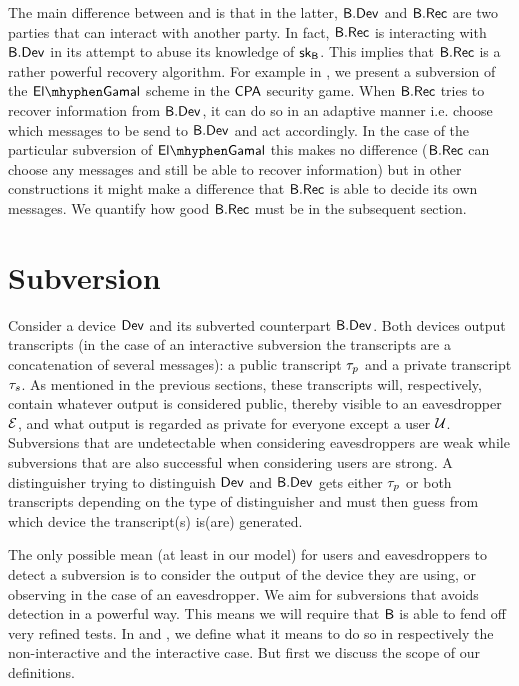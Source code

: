 The main difference between  and  is that in the latter, $\mathsf{B}.\mathsf{Dev}$ and $\mathsf{B}.\mathsf{Rec}$ are two parties that can interact with another party. In fact, $\mathsf{B}.\mathsf{Rec}$ is interacting with $\mathsf{B}.\mathsf{Dev}$ in its attempt to abuse its knowledge of $\mathsf{sk}_{\mathsf{B}}$. This implies that $\mathsf{B}.\mathsf{Rec}$ is a rather powerful recovery algorithm. For example in , we present a subversion of the $\elGamal$ scheme in the $\mathsf{CPA}$ security game. When $\mathsf{B}.\mathsf{Rec}$ tries to recover information from $\mathsf{B}.\mathsf{Dev}$, it can do so in an adaptive manner i.e. choose which messages to be send to $\mathsf{B}.\mathsf{Dev}$ and act accordingly. In the case of the particular subversion of $\elGamal$ this makes no difference ($\mathsf{B}.\mathsf{Rec}$ can choose any messages and still be able to recover information) but in other constructions it might make a difference that $\mathsf{B}.\mathsf{Rec}$ is able to decide its own messages. We quantify how good $\mathsf{B}.\mathsf{Rec}$ must be in the subsequent section. 

\section{Subversion}

Consider a device $\operatorname{\mathsf{Dev}}$ and its subverted counterpart $\mathsf{B}.\mathsf{Dev}$. Both devices output transcripts (in the case of an interactive subversion the transcripts are a concatenation of several messages): a public transcript $\tau_p$ and a private transcript $\tau_s$. As mentioned in the previous sections, these transcripts will, respectively, contain whatever output is considered public, thereby visible to an eavesdropper $\mathcal{E}$, and what output is regarded as private for everyone except a user $\mathcal{U}$. Subversions that are undetectable when considering eavesdroppers are weak while subversions that are also successful when considering users are strong. A distinguisher trying to distinguish $\operatorname{\mathsf{Dev}}$ and $\mathsf{B}.\mathsf{Dev}$ gets either $\tau_p$ or both transcripts depending on the type of distinguisher and must then guess from which device the transcript(s) is(are) generated.  

The only possible mean (at least in our model) for users and eavesdroppers to detect a subversion is to consider the output of the device they are using, or observing in the case of an eavesdropper. We aim for subversions that avoids detection in a powerful way. This means we will require that $\mathsf{B}$ is able to fend off very refined tests. In  and , we define what it means to do so in respectively the non-interactive and  the interactive case. But first we discuss the scope of our definitions.

